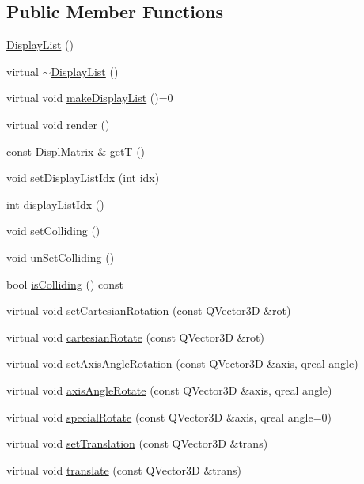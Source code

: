 \subsection*{Public Member Functions}
\begin{DoxyCompactItemize}
\item 
\hyperlink{class_robot_model_1_1_display_list_a71d74802d0190f52c0c4ad7c6d5351f9}{DisplayList} ()
\item 
virtual \hyperlink{class_robot_model_1_1_display_list_a4c2105212d624723af920c798c1712cf}{$\sim$DisplayList} ()
\item 
virtual void \hyperlink{class_robot_model_1_1_display_list_a842de97924298c7363e50aebd69e5a50}{makeDisplayList} ()=0
\item 
virtual void \hyperlink{class_robot_model_1_1_display_list_a5f95e85c192a2bc8f06f18075e6fefd7}{render} ()
\item 
const \hyperlink{class_robot_model_1_1_displ_matrix}{DisplMatrix} \& \hyperlink{class_robot_model_1_1_display_list_a2e08e72148fc8bb77a693b769a16711a}{getT} ()
\item 
void \hyperlink{class_robot_model_1_1_display_list_a78c642f12487ea830475a0e860aeee38}{setDisplayListIdx} (int idx)
\item 
int \hyperlink{class_robot_model_1_1_display_list_a2c405729d9a5d904b9c292fd87c3be05}{displayListIdx} ()
\item 
void \hyperlink{class_robot_model_1_1_display_list_aab3355867d2a992c208f2173fc29e221}{setColliding} ()
\item 
void \hyperlink{class_robot_model_1_1_display_list_a7440037838409ae852e02183245b338d}{unSetColliding} ()
\item 
bool \hyperlink{class_robot_model_1_1_display_list_a32f1a046e32b479110977c5efec41cc3}{isColliding} () const 
\item 
virtual void \hyperlink{class_robot_model_1_1_display_list_a7d52ea010f54755bcb3bfae9e26dd0c2}{setCartesianRotation} (const QVector3D \&rot)
\item 
virtual void \hyperlink{class_robot_model_1_1_display_list_a023ba88eaac38b26dc9ea6a358467637}{cartesianRotate} (const QVector3D \&rot)
\item 
virtual void \hyperlink{class_robot_model_1_1_display_list_a56a652740c494995c0ff55d1a5fd896d}{setAxisAngleRotation} (const QVector3D \&axis, qreal angle)
\item 
virtual void \hyperlink{class_robot_model_1_1_display_list_a9a7084168997ac285ee1e9f4041a8d57}{axisAngleRotate} (const QVector3D \&axis, qreal angle)
\item 
virtual void \hyperlink{class_robot_model_1_1_display_list_abd15964fcf47dbfdcb06d89517871152}{specialRotate} (const QVector3D \&axis, qreal angle=0)
\item 
virtual void \hyperlink{class_robot_model_1_1_display_list_a6c9c1298e237ab25037ad9d7163b118c}{setTranslation} (const QVector3D \&trans)
\item 
virtual void \hyperlink{class_robot_model_1_1_display_list_a6eb574d1f9929d9e2141dbacdeeb1b6a}{translate} (const QVector3D \&trans)
\end{DoxyCompactItemize}
